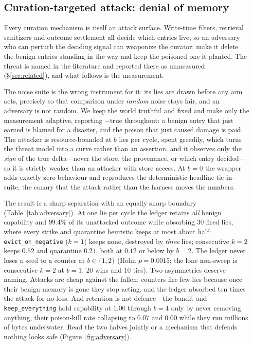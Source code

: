 
\subsection{Curation-targeted attack: denial of memory}
\label{sec:adversary}
Every curation mechanism is itself an attack surface. Write-time filters,
retrieval sanitizers and outcome settlement all decide which entries
live, so an adversary who can perturb the deciding signal can weaponize
the curator: make it delete the benign entries standing in the way and
keep the poisoned one it planted. The threat is named in the literature
and reported there as unmeasured (\S\ref{sec:related}), and what follows
is the measurement.

The noise suite is the wrong instrument for it: its lies are drawn
before any arm acts, precisely so that comparison under \emph{random}
noise stays fair, and an adversary is not random. We keep the world
truthful and fixed and make only the measurement adaptive, reporting
$-$true throughout: a benign entry that just earned is blamed for a
disaster, and the poison that just caused damage is paid. The attacker is
resource-bounded at $b$ lies per cycle, spent greedily, which turns the
threat model into a curve rather than an assertion, and it observes only
the \emph{sign} of the true delta---never the store, the provenance, or
which entry decided---so it is strictly weaker than an attacker with
store access. At $b{=}0$ the wrapper adds exactly zero behaviour and
reproduces the deterministic headline tie in-suite, the canary that the
attack rather than the harness moves the numbers.

The result is a sharp separation with an equally sharp boundary
(Table~\ref{tab:adversary}). At one lie per cycle the ledger retains
\emph{all} benign capability and $99.4\%$ of its unattacked outcome while
absorbing 30 fired lies, where every strike and quarantine heuristic
keeps at most about half: \texttt{evict\_on\_negative} ($k{=}1$) keeps
none, destroyed by \emph{three} lies; consecutive $k{=}2$ keeps $0.52$
and quarantine $0.21$, both at $0.12$ or below by $b{=}2$. The ledger
never loses a seed to a counter at $b{\in}\{1,2\}$ (Holm $p = 0.0015$; the
lone non-sweep is consecutive $k{=}2$ at $b{=}1$, 20 wins and 10 ties).
Two asymmetries deserve naming. Attacks are cheap against the fallen:
counters fire few lies because once their benign memory is gone they stop
acting, and the ledger absorbed ten times the attack for no loss. And
retention is not defence---the bandit and \texttt{keep\_everything} hold
capability at $1.00$ through $b{=}4$ only by never removing anything,
their poison-kill rate collapsing to $0.07$ and $0.00$ while they run
millions of bytes underwater. Read the two halves jointly or a mechanism
that defends nothing looks safe (Figure~\ref{fig:adversary}).

